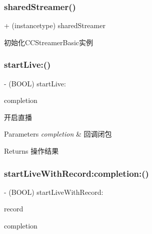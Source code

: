 \subsubsection{\texorpdfstring{shared\+Streamer()}{sharedStreamer()}}
{\footnotesize\ttfamily + (instancetype) shared\+Streamer \begin{DoxyParamCaption}{ }\end{DoxyParamCaption}}

初始化\+C\+C\+Streamer\+Basic实例 \mbox{\label{interface_c_c_streamer_basic_ad9f91717c4dd487f254ace9a7237af4d}} 
\subsubsection{\texorpdfstring{start\+Live\+:()}{startLive:()}}
{\footnotesize\ttfamily -\/ (B\+O\+OL) start\+Live\+: \begin{DoxyParamCaption}\item[{(C\+C\+Comletion\+Block)}]{completion }\end{DoxyParamCaption}}

开启直播 
\begin{DoxyParams}{Parameters}
{\em completion} & 回调闭包 \\
\hline
\end{DoxyParams}
\begin{DoxyReturn}{Returns}
操作结果 
\end{DoxyReturn}
\mbox{\label{interface_c_c_streamer_basic_a1a7e5e90d65f3a07b6de817b120e6f2a}} 
\subsubsection{\texorpdfstring{start\+Live\+With\+Record\+:completion\+:()}{startLiveWithRecord:completion:()}}
{\footnotesize\ttfamily -\/ (B\+O\+OL) start\+Live\+With\+Record\+: \begin{DoxyParamCaption}\item[{(B\+O\+OL)}]{record }\item[{completion:(C\+C\+Comletion\+Block)}]{completion }\end{DoxyParamCaption}}

